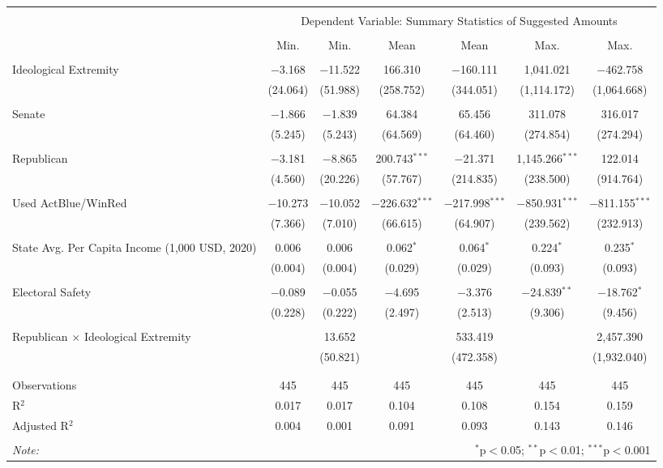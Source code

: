 
\begin{tabular}{@{\extracolsep{5pt}}lcccccc} 
\\[-1.8ex]\hline 
\hline \\[-1.8ex] 
 & \multicolumn{6}{c}{Dependent Variable: Summary Statistics of Suggested Amounts} \\ 
\cline{2-7} 
\\[-1.8ex] & Min. & Min. & Mean & Mean & Max. & Max. \\ 
\hline \\[-1.8ex] 
 Ideological Extremity & $-$3.168 & $-$11.522 & 166.310 & $-$160.111 & 1,041.021 & $-$462.758 \\ 
  & (24.064) & (51.988) & (258.752) & (344.051) & (1,114.172) & (1,064.668) \\ 
  & & & & & & \\ 
 Senate & $-$1.866 & $-$1.839 & 64.384 & 65.456 & 311.078 & 316.017 \\ 
  & (5.245) & (5.243) & (64.569) & (64.460) & (274.854) & (274.294) \\ 
  & & & & & & \\ 
 Republican & $-$3.181 & $-$8.865 & 200.743$^{***}$ & $-$21.371 & 1,145.266$^{***}$ & 122.014 \\ 
  & (4.560) & (20.226) & (57.767) & (214.835) & (238.500) & (914.764) \\ 
  & & & & & & \\ 
 Used ActBlue/WinRed & $-$10.273 & $-$10.052 & $-$226.632$^{***}$ & $-$217.998$^{***}$ & $-$850.931$^{***}$ & $-$811.155$^{***}$ \\ 
  & (7.366) & (7.010) & (66.615) & (64.907) & (239.562) & (232.913) \\ 
  & & & & & & \\ 
 State Avg. Per Capita Income (1,000 USD, 2020) & 0.006 & 0.006 & 0.062$^{*}$ & 0.064$^{*}$ & 0.224$^{*}$ & 0.235$^{*}$ \\ 
  & (0.004) & (0.004) & (0.029) & (0.029) & (0.093) & (0.093) \\ 
  & & & & & & \\ 
 Electoral Safety & $-$0.089 & $-$0.055 & $-$4.695 & $-$3.376 & $-$24.839$^{**}$ & $-$18.762$^{*}$ \\ 
  & (0.228) & (0.222) & (2.497) & (2.513) & (9.306) & (9.456) \\ 
  & & & & & & \\ 
 Republican $\times$ Ideological Extremity &  & 13.652 &  & 533.419 &  & 2,457.390 \\ 
  &  & (50.821) &  & (472.358) &  & (1,932.040) \\ 
  & & & & & & \\ 
\hline \\[-1.8ex] 
Observations & 445 & 445 & 445 & 445 & 445 & 445 \\ 
R$^{2}$ & 0.017 & 0.017 & 0.104 & 0.108 & 0.154 & 0.159 \\ 
Adjusted R$^{2}$ & 0.004 & 0.001 & 0.091 & 0.093 & 0.143 & 0.146 \\ 
\hline 
\hline \\[-1.8ex] 
\textit{Note:}  & \multicolumn{6}{r}{$^{*}$p$<$0.05; $^{**}$p$<$0.01; $^{***}$p$<$0.001} \\ 
\end{tabular} 
